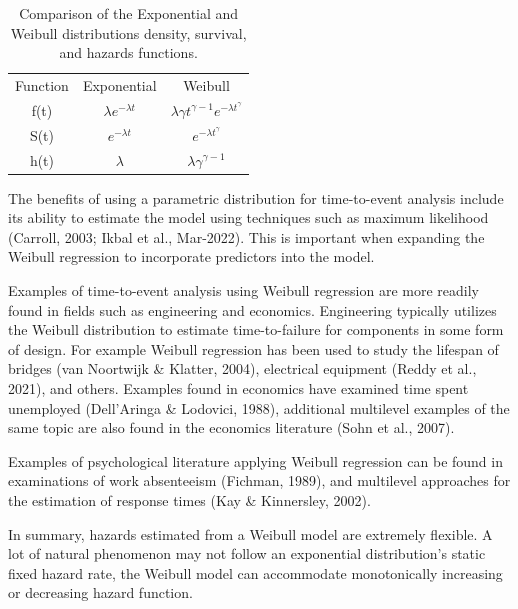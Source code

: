 \documentclass[12pt]{./styles/outhesis}
\begin{document}
\begin{table}
    \centering
    \begin{tabular}{ccc}
        Function & Exponential & Weibull \\
        f(t) & \(\lambda e^{-\lambda t}\) &
\(\lambda\gamma t^{\gamma-1}e^{-\lambda t^{\gamma}}\) \\
        S(t) & \(e^{-\lambda t}\) & \(e^{-\lambda t^\gamma}\) \\
        h(t) & \(\lambda\) & \(\lambda \gamma ^{\gamma - 1}\) \\
    \end{tabular}
    \caption{Comparison of the Exponential and Weibull distributions
density, survival, and hazards functions.}
    \label{tab:my_label}
\end{table}

The benefits of using a parametric distribution for time-to-event
analysis include its ability to estimate the model using techniques such
as maximum likelihood (Carroll, 2003; Ikbal et al., Mar-2022). This is
important when expanding the Weibull regression to incorporate
predictors into the model.

Examples of time-to-event analysis using Weibull regression are more
readily found in fields such as engineering and economics. Engineering
typically utilizes the Weibull distribution to estimate time-to-failure
for components in some form of design. For example Weibull regression
has been used to study the lifespan of bridges (van Noortwijk \&
Klatter, 2004), electrical equipment (Reddy et al., 2021), and others.
Examples found in economics have examined time spent unemployed
(Dell'Aringa \& Lodovici, 1988), additional multilevel examples of the
same topic are also found in the economics literature (Sohn et al.,
2007).

Examples of psychological literature applying Weibull regression can be
found in examinations of work absenteeism (Fichman, 1989), and
multilevel approaches for the estimation of response times (Kay \&
Kinnersley, 2002).

In summary, hazards estimated from a Weibull model are extremely
flexible. A lot of natural phenomenon may not follow an exponential
distribution's static fixed hazard rate, the Weibull model can
accommodate monotonically increasing or decreasing hazard function.
\end{document}
